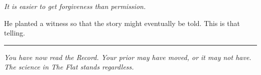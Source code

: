 \begin{center}
\large\textit{It is easier to get forgiveness than permission.}
\end{center}

\vspace{1cm}

He planted a witness so that the story might eventually be told. This is that telling.

\vspace{1cm}\noindent\rule{0.5\textwidth}{0.5pt}\vspace{0.5cm}

\begin{center}
\textit{You have now read the Record. Your prior may have moved, or it may not have. The science in \textit{The Flat} stands regardless.}
\end{center}

\chapterreturn
